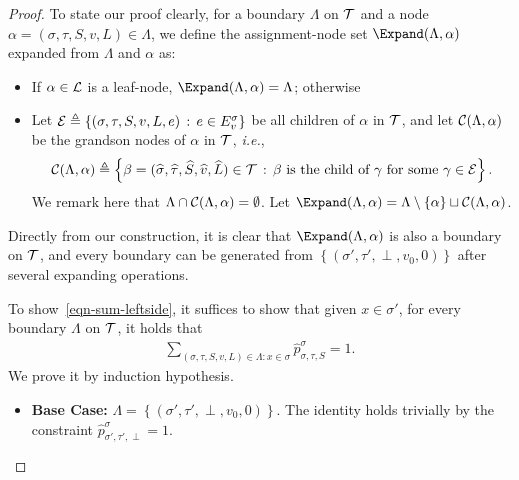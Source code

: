 \documentclass[11pt]{article}
\newcommand{\set}[1]{\left\{#1\right\}}
\newcommand{\defeq}{\triangleq} \renewcommand{\d}{\,\-d}
\def\IE{\emph{i.e.}}
\newcommand{\wh}[1]{\widehat{#1}}
\begin{document}
\begin{proof}
    {
    \color{blue}
    To state our proof clearly, for a boundary $\Lambda$ on $\mathcal{T}$ and a node $\alpha = (\sigma, \tau, S, v, L) \in \Lambda$, we define the assignment-node set $\Expand(\Lambda, \alpha)$ expanded from $\Lambda$ and $\alpha$ as:
    \begin{itemize}
        \item If $\alpha \in \mathcal{L}$ is a leaf-node, $\Expand(\Lambda, \alpha) = \Lambda$; otherwise
        \item Let $\+E \defeq \set{(\sigma, \tau, S, v, L, e) \cmid e \in E_v^\sigma}$ be all children of $\alpha$ in $\mathcal{T}$, and let $\mathcal{C}(\Lambda, \alpha)$ be the grandson nodes of $\alpha$ in $\mathcal{T}$, \IE,
        $$
            \+C(\Lambda, \alpha) \defeq \set{\beta = (\wh{\sigma}, \wh{\tau}, \wh{S}, \wh{v}, \wh{L}) \in \+T \cmid \mbox{$\beta$ is the child of $\gamma$ for some $\gamma \in \+E$}}.
        $$
        We remark here that $\Lambda \cap \mathcal{C}(\Lambda, \alpha) = \emptyset$. Let $\Expand(\Lambda, \alpha) = \Lambda \setminus \set{\alpha} \sqcup \+C(\Lambda, \alpha)$.
    \end{itemize}

    Directly from our construction, it is clear that $\Expand(\Lambda, \alpha)$ is also a boundary on $\mathcal{T}$, and every boundary can be generated from $\set{(\sigma', \tau', \perp, v_0, 0)}$ after several expanding operations.
    }
    
    To show~\eqref{eqn-sum-leftside}, it suffices to show that given $x \in \sigma'$, for every boundary $\Lambda$ on $\mathcal{T}$, it holds that
    \begin{align} \label{eq:extend-version-of-identity}
        \sum_{(\sigma, \tau, S, v, L) \in \Lambda : x \in \sigma} \wh{p}_{\sigma, \tau, S}^{\sigma} = 1.
    \end{align}
    We prove it by induction hypothesis.
    \begin{itemize}
        \item \textbf{Base Case:} $\Lambda = \set{(\sigma', \tau', \perp, v_0, 0)}$. The identity holds trivially by the constraint $\wh{p}_{\sigma', \tau', \perp}^\sigma = 1$.


\end{itemize}
\end{proof}
\end{document}
